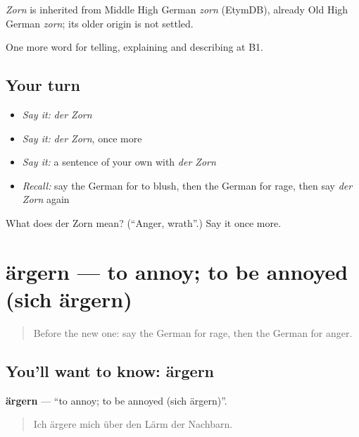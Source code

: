 \begin{cousinweb}
\emph{Zorn} is inherited from Middle High German \emph{zorn} (EtymDB), already Old High German \emph{zorn}; its older origin is not settled.
\end{cousinweb}

\begin{grammarlens}[title={What you've built}]
One more word for telling, explaining and describing at B1.
\end{grammarlens}

\subsection*{Your turn}
\begin{itemize}
\raggedright
  \item \emph{Say it:} \emph{der Zorn}
  \item \emph{Say it:} \emph{der Zorn}, once more
  \item \emph{Say it:} a sentence of your own with \emph{der Zorn}
  \item \emph{Recall:} say the German for to blush, then the German for rage, then say \emph{der Zorn} again
\end{itemize}

\begin{tcolorbox}[breakable,colback=teal!4,colframe=teal!35!black,title={Before you move on}]
What does der Zorn mean? (\textquotedblleft{}Anger, wrath\textquotedblright{}.) Say it once more.
\end{tcolorbox}
\section[ärgern]{ärgern — to annoy; to be annoyed (sich ärgern)}

\label{lesson:GE-C468-aergern}



\begin{quote}
Before the new one: say the German for rage, then the German for anger.
\end{quote}

\subsection*{You'll want to know: ärgern}
\textbf{ärgern} — \textquotedblleft{}to annoy; to be annoyed (sich ärgern)\textquotedblright{}.

\begin{quote}
Ich ärgere mich über den Lärm der Nachbarn.
\end{quote}

